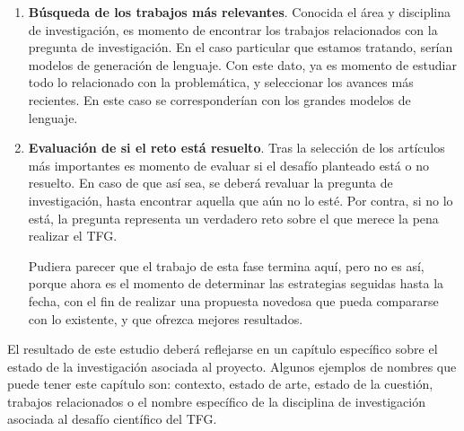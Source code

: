 \begin{enumerate}
    \item \textbf{Búsqueda de los trabajos más relevantes}. Conocida el área y disciplina de investigación, es momento de encontrar los trabajos relacionados con la pregunta de investigación. En el caso particular que estamos tratando, serían modelos de generación de lenguaje. Con este dato, ya es momento de estudiar todo lo relacionado con la problemática, y seleccionar los avances más recientes. En este caso se corresponderían con los grandes modelos de lenguaje.

    \item \textbf{Evaluación de si el reto está resuelto}. Tras la selección de los artículos más importantes es momento de evaluar si el desafío planteado está o no resuelto. En caso de que así sea, se deberá revaluar la pregunta de investigación, hasta encontrar aquella que aún no lo esté. Por contra, si no lo está, la pregunta representa un verdadero reto sobre el que merece la pena realizar el TFG.
    
    Pudiera parecer que el trabajo de esta fase termina aquí, pero no es así, porque ahora es el momento de determinar las estrategias seguidas hasta la fecha, con el fin de realizar una propuesta novedosa que pueda compararse con lo existente, y que ofrezca mejores resultados.
\end{enumerate}

El resultado de este estudio deberá reflejarse en un capítulo específico sobre el estado de la investigación asociada al proyecto. Algunos ejemplos de nombres que puede tener este capítulo son: contexto, estado de arte, estado de la cuestión, trabajos relacionados o el nombre específico de la disciplina de investigación asociada al desafío científico del TFG.

